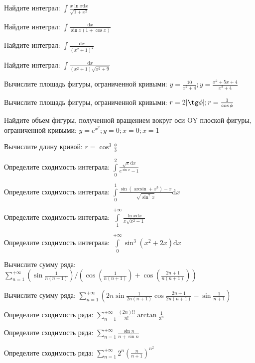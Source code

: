 \documentclass[russian]{article}
\newcommand{\dx}{\text{d}x}
\begin{document}
Найдите интеграл:
$\int \frac{x \ln x \dx}{\sqrt{1 + x^2}}$

Найдите интеграл:
$\int \frac{\dx}{\sin x ( 1 + \cos x)}$

Найдите интеграл:
$\int \frac{\dx}{(x^2 + 1)^2}$

Найдите интеграл:
$\int \frac{\dx}{(x^2 + 1) \sqrt{x^2 + 9}}$

Вычислите площадь фигуры, ограниченной кривыми:
$y = \frac{10}{x^2 + 4}; y = \frac{x^2 + 5x + 4}{x^2 + 4}$

Вычислите площадь фигуры, ограниченной кривыми:
$r = 2 |\tg \phi|; r = \frac{1}{\cos \phi}$

Найдите объем фигуры, полученной вращением вокруг оси OY плоской фигуры, ограниченной кривыми:
$y = e^{x^2}; y = 0; x = 0; x = 1$

Вычислите длину кривой:
$r = \cos^3 \frac{\phi}{3}$

Определите сходимость интеграла:
$\int\limits_{0}^{2} \frac{\sqrt{x}\dx}{e^{\sin{x}} - 1}$

Определите сходимость интеграла:
$\int\limits_{0}^{1} \frac{\sin(\arcsin + x^3) - x}{\sqrt{\sin^7 x}} \dx$

Определите сходимость интеграла:
$\int\limits_{1}^{+\infty} \frac{\ln{x}\dx}{x \sqrt{x^2 - 1}}$

Определите сходимость интеграла:
$\int\limits_{0}^{+\infty} \sin^3 (x^2 + 2x) \dx$

Вычислите сумму ряда:
$\sum\limits_{n = 1}^{+\infty} \left(\sin \frac{1}{n(n + 1)} \right) / \left(\cos\left(\frac{1}{n(n + 1)}\right) + \cos\left(\frac{2n + 1}{n(n + 1)}\right)\right)$

Вычислите сумму ряда:
$\sum\limits_{n = 1}^{+\infty} \left(2n\sin\frac{1}{2n(n + 1)}\cos\frac{2n + 1}{2n(n + 1)} - \sin\frac{1}{n + 1}\right)$

Определите сходимость ряда:
$\sum\limits_{n=1}^{+\infty} \frac{(2n)!!}{n!} \arctan\frac{1}{3^n}$

Определите сходимость ряда:
$\sum\limits_{n=1}^{+\infty} \frac{\sin{n}}{n + \sin{n}}$

Определите сходимость ряда:
$\sum\limits_{n=1}^{+\infty} 2^n\left(\frac{n}{n+1}\right)^{n^2}$
\end{document}
